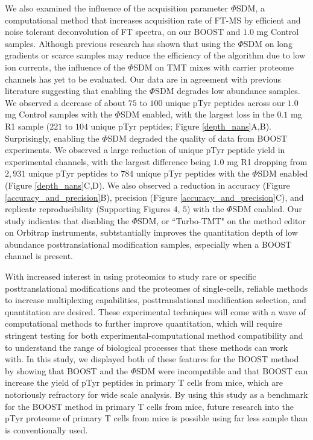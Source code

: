 \documentclass[journal=jprobs,manuscript=article]{achemso}
\begin{document}
We also examined the influence of the acquisition parameter $\Phi$SDM, a computational method that increases acquisition rate of FT-MS by efficient and noise tolerant deconvolution of FT spectra\cite{grinfeld2017phase}, on our BOOST and $1.0$ mg Control samples. Although previous research has shown that using the $\Phi$SDM on long gradients or scarce samples may reduce the efficiency of the algorithm due to low ion currents\cite{grinfeld2017phase,yu2020benchmarking,kelstrup2018limits}, the influence of the $\Phi$SDM on TMT mixes with carrier proteome channels has yet to be evaluated. Our data are in agreement with previous literature suggesting that enabling the $\Phi$SDM degrades low abundance samples. We observed a decrease of about $75$ to $100$ unique pTyr peptides across our $1.0$ mg Control samples with the $\Phi$SDM enabled, with the largest loss in the $0.1$ mg R1 sample ($221$ to $104$ unique pTyr peptides; Figure \ref{depth_nans}A,B). Surprisingly, enabling the $\Phi$SDM degraded the quality of data from BOOST experiments. We observed a large reduction of unique pTyr peptide yield in experimental channels, with the largest difference being $1.0$ mg R1 dropping from $2{,}931$ unique pTyr peptides to $784$ unique pTyr peptides with the $\Phi$SDM enabled (Figure \ref{depth_nans}C,D). We also observed a reduction in accuracy (Figure \ref{accuracy_and_precision}B), precision (Figure \ref{accuracy_and_precision}C), and replicate reproducibility (Supporting Figures $4$, $5$) with the $\Phi$SDM enabled. Our study indicates that disabling the $\Phi$SDM, or ``Turbo-TMT" on the method editor on Orbitrap instruments, subtstantially improves the quantitation depth of low abundance posttranslational modification samples, especially when a BOOST channel is present.

With increased interest in using proteomics to study rare or specific posttranslational modifications\cite{millan2020histone,yao2019one,fulzele2018ubiquitin} and the proteomes of single-cells\cite{petelski2021multiplexed,cheung2021defining,vistain2021single}, reliable methods to increase multiplexing capabilities\cite{arul2018sample}, posttranslational modification selection\cite{pieroni2020enrichments}, and quantitation\cite{chua2020tandem,chua2021ovalbumin,pino2020acquiring} are desired. These experimental techniques will come with a wave of computational methods to further improve quantitation\cite{grinfeld2017phase,sinitcyn2021maxdia,bilbao2018algorithm}, which will require stringent testing for both experimental-computational method compatibility and to understand the range of biological processes that these methods can work with. In this study, we displayed both of these features for the BOOST method by showing that BOOST and the $\Phi$SDM were incompatible and that BOOST can increase the yield of pTyr peptides in primary T cells from mice, which are notoriously refractory for wide scale analysis\cite{locard2020lymphoatlas}. By using this study as a benchmark for the BOOST method in primary T cells from mice, future research into the pTyr proteome of primary T cells from mice is possible using far less sample than is conventionally used.
\end{document}
